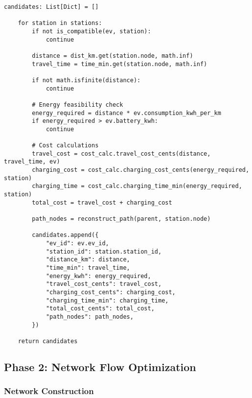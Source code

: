 \documentclass[12pt,a4paper]{article}
\begin{document}
\begin{lstlisting}[caption=Comprehensive Cost Calculation]
    candidates: List[Dict] = []
    
    for station in stations:
        if not is_compatible(ev, station):
            continue
        
        distance = dist_km.get(station.node, math.inf)
        travel_time = time_min.get(station.node, math.inf)
        
        if not math.isfinite(distance):
            continue
        
        # Energy feasibility check
        energy_required = distance * ev.consumption_kwh_per_km
        if energy_required > ev.battery_kwh:
            continue
        
        # Cost calculations
        travel_cost = cost_calc.travel_cost_cents(distance, travel_time, ev)
        charging_cost = cost_calc.charging_cost_cents(energy_required, station)
        charging_time = cost_calc.charging_time_min(energy_required, station)
        total_cost = travel_cost + charging_cost
        
        path_nodes = reconstruct_path(parent, station.node)
        
        candidates.append({
            "ev_id": ev.ev_id,
            "station_id": station.station_id,
            "distance_km": distance,
            "time_min": travel_time,
            "energy_kwh": energy_required,
            "travel_cost_cents": travel_cost,
            "charging_cost_cents": charging_cost,
            "charging_time_min": charging_time,
            "total_cost_cents": total_cost,
            "path_nodes": path_nodes,
        })
    
    return candidates
\end{lstlisting}

\subsection{Phase 2: Network Flow Optimization}

\subsubsection{Network Construction}
\end{document}
